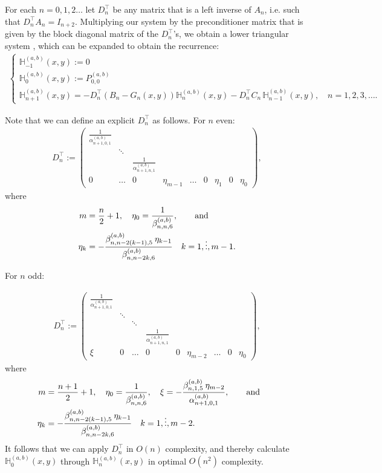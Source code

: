 \documentclass[11pt, oneside]{article}   	%
\newcommand{\hdop}{H}
\newcommand{\bighdop}{\mathbb{\hdop}}
\newcommand{\alphaab}{\alpha^{(a,b)}}
\newcommand{\betaab}{\beta^{(a,b)}}
\newcommand{\bighdopab}{\bighdop^{(a,b)}}
\newcommand{\Dnt}{D^\top_n}
\begin{document}
For each $n = 0,1,2\dots$ let $\Dnt$ be any matrix that is a left inverse of $A_n$, i.e. such that $\Dnt A_n = I_{n+2}$. Multiplying our system by the preconditioner matrix that is given by the block diagonal matrix of the $\Dnt$'s, we obtain a lower triangular system \cite[p78]{dunkl2014orthogonal}, which can be expanded to obtain the recurrence:
\begin{align*}
\begin{cases}
\bighdopab_{-1}(x,y) := 0 \\
\bighdopab_{0}(x,y) := P^{(a,b)}_{0,0} \\
\bighdopab_{n+1}(x,y) = -\Dnt (B_n-G_n(x,y)) \bighdopab_n(x,y) - \Dnt C_n  \,\bighdopab_{n-1}(x,y), \quad n = 1,2,3,\dots.
\end{cases}
\end{align*}

Note that we can define an explicit \(\Dnt\) as follows. For \(n\) even:
\begin{align*}
\Dnt := \begin{pmatrix}
		\frac{1}{\alphaab_{n+1,0,1}} & & &  \\
		& \ddots & & & \\
		& & \frac{1}{\alphaab_{n+1,n,1}} & \\
		0 & \hdots & 0 & \eta_{m-1} & \hdots & 0 & \eta_1 & 0 & \eta_0
	    \end{pmatrix},
\end{align*}
where
\begin{align*}
m &= \frac{n}{2} + 1, \quad \eta_0 = \frac{1}{\betaab_{n,n,6}},\qqand \nonumber \\
\eta_k &= -\frac{\betaab_{n,n-2(k-1),5} \: \eta_{k-1}}{\betaab_{n,n-2k,6}} \quad k = 1,\dots,m-1.
\end{align*}

For \(n\) odd:

\begin{align*}
\Dnt := \begin{pmatrix}
		\frac{1}{\alphaab_{n+1,0,1}} & &  \\
		& \ddots & & &  \\
		& & \ddots & & \\
		& & & \frac{1}{\alphaab_{n+1,n,1}} & \\
		\xi & 0 & \hdots & 0 & 0 & \eta_{m-2} & \hdots & 0 & \eta_0
	    \end{pmatrix},
\end{align*}
 where
\begin{align*}
m &= \frac{n+1}{2} + 1,\quad  \eta_0 = \frac{1}{\betaab_{n,n,6}}, \quad \xi = -\frac{\betaab_{n,1,5} \: \eta_{m-2}}{\alphaab_{n+1,0,1}},\qqand \nonumber \\
\eta_k &= -\frac{\betaab_{n,n-2(k-1),5} \: \eta_{k-1}}{\betaab_{n,n-2k,6}} \quad k = 1,\dots,m-2.
\end{align*}
It follows that we can apply $\Dnt$ in $O(n)$ complexity, and thereby calculate $\bighdopab_{0}(x,y)$  through $\bighdopab_{n}(x,y)$ in optimal $O(n^2)$ complexity.
\end{document}
